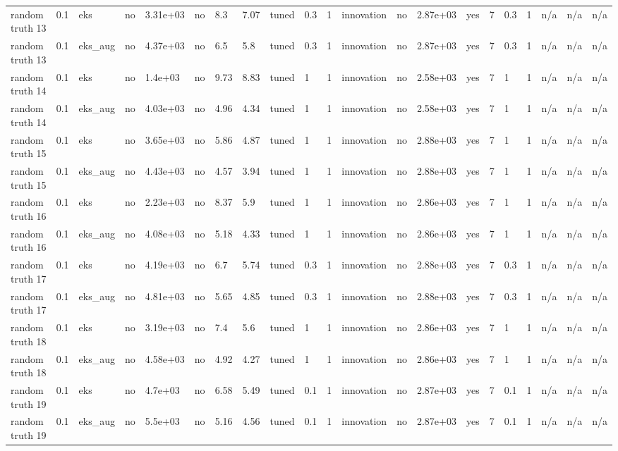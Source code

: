 \begin{table}[t]
\begin{tabular}{lllllllllllllllllllll}
random truth 13 & 0.1 & eks & no & 3.31e+03 & no & 8.3 & 7.07 & tuned & 0.3 & 1 & innovation & no & 2.87e+03 & yes & 7 & 0.3 & 1 & n/a & n/a & n/a \\
random truth 13 & 0.1 & eks\_aug & no & 4.37e+03 & no & 6.5 & 5.8 & tuned & 0.3 & 1 & innovation & no & 2.87e+03 & yes & 7 & 0.3 & 1 & n/a & n/a & n/a \\
random truth 14 & 0.1 & eks & no & 1.4e+03 & no & 9.73 & 8.83 & tuned & 1 & 1 & innovation & no & 2.58e+03 & yes & 7 & 1 & 1 & n/a & n/a & n/a \\
random truth 14 & 0.1 & eks\_aug & no & 4.03e+03 & no & 4.96 & 4.34 & tuned & 1 & 1 & innovation & no & 2.58e+03 & yes & 7 & 1 & 1 & n/a & n/a & n/a \\
random truth 15 & 0.1 & eks & no & 3.65e+03 & no & 5.86 & 4.87 & tuned & 1 & 1 & innovation & no & 2.88e+03 & yes & 7 & 1 & 1 & n/a & n/a & n/a \\
random truth 15 & 0.1 & eks\_aug & no & 4.43e+03 & no & 4.57 & 3.94 & tuned & 1 & 1 & innovation & no & 2.88e+03 & yes & 7 & 1 & 1 & n/a & n/a & n/a \\
random truth 16 & 0.1 & eks & no & 2.23e+03 & no & 8.37 & 5.9 & tuned & 1 & 1 & innovation & no & 2.86e+03 & yes & 7 & 1 & 1 & n/a & n/a & n/a \\
random truth 16 & 0.1 & eks\_aug & no & 4.08e+03 & no & 5.18 & 4.33 & tuned & 1 & 1 & innovation & no & 2.86e+03 & yes & 7 & 1 & 1 & n/a & n/a & n/a \\
random truth 17 & 0.1 & eks & no & 4.19e+03 & no & 6.7 & 5.74 & tuned & 0.3 & 1 & innovation & no & 2.88e+03 & yes & 7 & 0.3 & 1 & n/a & n/a & n/a \\
random truth 17 & 0.1 & eks\_aug & no & 4.81e+03 & no & 5.65 & 4.85 & tuned & 0.3 & 1 & innovation & no & 2.88e+03 & yes & 7 & 0.3 & 1 & n/a & n/a & n/a \\
random truth 18 & 0.1 & eks & no & 3.19e+03 & no & 7.4 & 5.6 & tuned & 1 & 1 & innovation & no & 2.86e+03 & yes & 7 & 1 & 1 & n/a & n/a & n/a \\
random truth 18 & 0.1 & eks\_aug & no & 4.58e+03 & no & 4.92 & 4.27 & tuned & 1 & 1 & innovation & no & 2.86e+03 & yes & 7 & 1 & 1 & n/a & n/a & n/a \\
random truth 19 & 0.1 & eks & no & 4.7e+03 & no & 6.58 & 5.49 & tuned & 0.1 & 1 & innovation & no & 2.87e+03 & yes & 7 & 0.1 & 1 & n/a & n/a & n/a \\
random truth 19 & 0.1 & eks\_aug & no & 5.5e+03 & no & 5.16 & 4.56 & tuned & 0.1 & 1 & innovation & no & 2.87e+03 & yes & 7 & 0.1 & 1 & n/a & n/a & n/a \\

\end{tabular}
\end{table}
